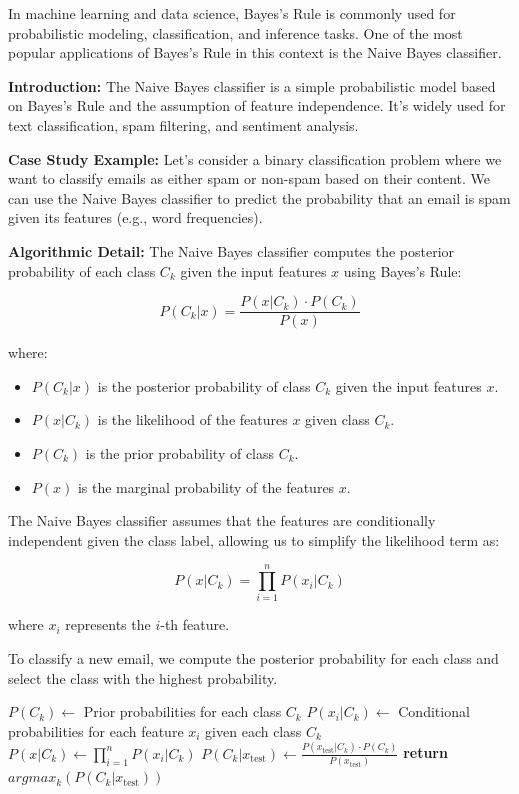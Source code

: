 \documentclass[12pt]{book} %
\begin{document}
In machine learning and data science, Bayes's Rule is commonly used for probabilistic modeling, classification, and inference tasks. One of the most popular applications of Bayes's Rule in this context is the Naive Bayes classifier.

\textbf{Introduction:} The Naive Bayes classifier is a simple probabilistic model based on Bayes's Rule and the assumption of feature independence. It's widely used for text classification, spam filtering, and sentiment analysis.

\textbf{Case Study Example:} Let's consider a binary classification problem where we want to classify emails as either spam or non-spam based on their content. We can use the Naive Bayes classifier to predict the probability that an email is spam given its features (e.g., word frequencies).

\textbf{Algorithmic Detail:}
The Naive Bayes classifier computes the posterior probability of each class \(C_k\) given the input features \(x\) using Bayes's Rule:

\[
P(C_k | x) = \frac{P(x | C_k) \cdot P(C_k)}{P(x)}
\]

where:
\begin{itemize}
    \item \(P(C_k | x)\) is the posterior probability of class \(C_k\) given the input features \(x\).
    \item \(P(x | C_k)\) is the likelihood of the features \(x\) given class \(C_k\).
    \item \(P(C_k)\) is the prior probability of class \(C_k\).
    \item \(P(x)\) is the marginal probability of the features \(x\).
\end{itemize}

The Naive Bayes classifier assumes that the features are conditionally independent given the class label, allowing us to simplify the likelihood term as:

\[
P(x | C_k) = \prod_{i=1}^{n} P(x_i | C_k)
\]

where \(x_i\) represents the \(i\)-th feature.

To classify a new email, we compute the posterior probability for each class and select the class with the highest probability.

\FloatBarrier
\begin{algorithm}
\caption{Naive Bayes Classifier}\label{naive_bayes}
\begin{algorithmic}[1]
\State $P(C_k) \gets$ Prior probabilities for each class $C_k$
\State $P(x_i | C_k) \gets$ Conditional probabilities for each feature $x_i$ given each class $C_k$
    \State $P(x | C_k) \gets \prod_{i=1}^{n} P(x_i | C_k)$ 
    \State $P(C_k | x_{\text{test}}) \gets \frac{P(x_{\text{test}} | C_k) \cdot P(C_k)}{P(x_{\text{test}})}$ 
\EndFor
\State \textbf{return} $argmax_k(P(C_k | x_{\text{test}}))$ 
\EndProcedure
\end{algorithmic}
\end{algorithm}
\FloatBarrier
\end{document}
